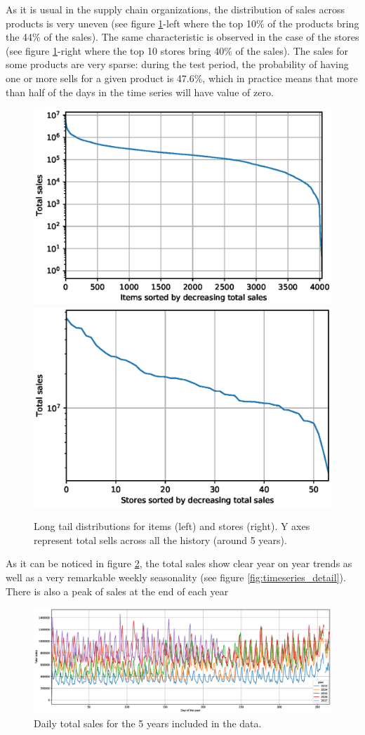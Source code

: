 \documentclass{elsarticle}
\begin{document}
	As it is usual in the supply chain organizations, the distribution of sales across products is very uneven (see figure \ref{fig:tails}-left where the top 10\% of the products bring the 44\% of the sales). The same characteristic is observed in the case of the stores (see figure \ref{fig:tails}-right where the top 10 stores bring 40\% of the sales). The sales for some products are very sparse: during the test period, the probability of having one or more sells for a given product is 47.6\%, which in practice means that more than half of the days in the time series will have value of zero.
	
	\begin{figure}
		\centering
		\includegraphics[width=0.48\linewidth]{img/items_tail_log}
		\includegraphics[width=0.48\linewidth]{img/stores_tail_log}
		\caption{Long tail distributions for items (left) and stores (right). Y axes represent total sells across all the history (around 5 years).}
		\label{fig:tails}
	\end{figure}
	
	 As it can be noticed in figure \ref{fig:timeseries}, the total sales show clear year on year trends as well as a very remarkable weekly seasonality (see figure \ref{fig:timeseries_detail}). There is also a peak of sales at the end of each year
	 
	 	\begin{figure}
	 	\centering
	 	\includegraphics[width=1\textwidth]{img/timeseries}
	 	\caption{Daily total sales for the 5 years included in the data.}
	 	\label{fig:timeseries}
	 \end{figure}
	
\end{document}
